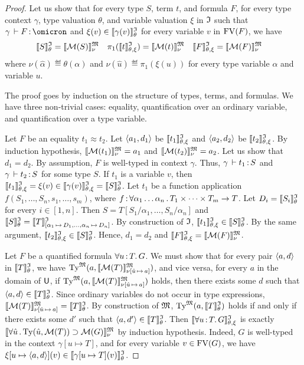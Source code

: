 \begin{proof}
Let us show that for every type $S$, term $t$, and formula $F$,
for every type context $\gamma$, type valuation $\theta$,
and variable valuation $\xi$ in $\mathfrak{I}$ such that
$\gamma\,\vdash F \ty \omicron$ and $\xi(v) \in \llbracket\gamma(v)\rrbracket^{\mathfrak{I}}_{\theta}$
for every variable $v$ in $\mathrm{FV}(F)$, we have
\begin{align*}
\llbracket S\rrbracket^{\mathfrak{I}}_{\theta} &= \llbracket \mathcal{M}(S) \rrbracket^{\mathfrak{M}}_{\nu} &
\pi_1(\llbracket t\rrbracket^{\mathfrak{I}}_{\theta,\xi}) &= \llbracket \mathcal{M}(t) \rrbracket^{\mathfrak{M}}_{\nu} &
\llbracket F\rrbracket^{\mathfrak{I}}_{\theta,\xi} &= \llbracket \mathcal{M}(F) \rrbracket^{\mathfrak{M}}_{\nu}
\end{align*}
where $\nu(\hat{\alpha}) \eqdef \theta(\alpha)$ and
$\nu(\hat{u}) \eqdef \pi_1(\xi(u))$
for every type variable $\alpha$ and variable $u$.

The proof goes by induction on the structure of types, terms, and formulas.
We have three non-trivial cases: equality, quantification over an ordinary
variable, and quantification over a type variable.

Let $F$ be an equality $t_1 \approx t_2$.
Let $\langle a_1, d_1 \rangle$ be $\llbracket t_1\rrbracket^{\mathfrak{I}}_{\theta,\xi}$ and $\langle a_2, d_2 \rangle$ be $\llbracket t_2\rrbracket^{\mathfrak{I}}_{\theta,\xi}$.
By induction hypothesis, $\llbracket \mathcal{M}(t_1) \rrbracket^{\mathfrak{M}}_{\nu} = a_1$ and
$\llbracket \mathcal{M}(t_2) \rrbracket^{\mathfrak{M}}_{\nu} = a_2$. Let us show that $d_1 = d_2$.
By assumption, $F$ is well-typed in context $\gamma$.
Thus, $\gamma\,\vdash t_1 \operatorname{:} S$ and $\gamma\,\vdash t_2 \operatorname{:} S$
for some type $S$.
If $t_1$ is a variable $v$, then
$\llbracket t_1\rrbracket^{\mathfrak{I}}_{\theta,\xi} = \xi(v) \in \llbracket\gamma(v)\rrbracket^{\mathfrak{I}}_{\theta,\xi} = \llbracket S\rrbracket^{\mathfrak{I}}_{\theta}$.
Let $t_1$ be a function application $f(S_1,\dots,S_n,s_1,\dots,s_m)$,
where $f \operatorname{:}
\forall \alpha_1\dots\alpha_n \,.\, T_1 \times \dots \times T_m \to T$.
Let $D_i = \llbracket S_i\rrbracket^{\mathfrak{I}}_{\theta}$ for every $i \in [1,n]$.
Then $S = T[S_1/\alpha_1,\dots,S_n/\alpha_n]$ and
$\llbracket S\rrbracket^{\mathfrak{I}}_{\theta} = \llbracket T \rrbracket^{\mathfrak{I}}_{[\alpha_1 \,\mapsto\, D_1,\dots,
\alpha_n \,\mapsto\, D_n]}$.
By construction of $\mathfrak{I}$, $\llbracket t_1\rrbracket^{\mathfrak{I}}_{\theta,\xi} \in \llbracket S\rrbracket^{\mathfrak{I}}_{\theta}$.
By the same argument, $\llbracket t_2\rrbracket^{\mathfrak{I}}_{\theta,\xi} \in \llbracket S\rrbracket^{\mathfrak{I}}_{\theta}$.
Hence, $d_1 = d_2$ and $\llbracket F\rrbracket^{\mathfrak{I}}_{\theta,\xi} = \llbracket \mathcal{M}(F) \rrbracket^{\mathfrak{M}}_{\nu}$.

Let $F$ be a quantified formula $\forall u \operatorname{:} T .\, G$.
We must show that for every pair $\langle a,d \rangle$ in $\llbracket T\rrbracket^{\mathfrak{I}}_{\theta}$, we have
$\mathrm{Ty}^{\mathfrak{M}}(a, \llbracket \mathcal{M}(T) \rrbracket^{\mathfrak{M}}_{\nu[\hat{u}\,\mapsto\,a]})$,
and vice versa, for every $a$ in the domain of $\mathsf{U}$, if
$\mathrm{Ty}^{\mathfrak{M}}(a, \llbracket \mathcal{M}(T) \rrbracket^{\mathfrak{M}}_{\nu[\hat{u}\,\mapsto\,a]})$
holds, then there exists some $d$ such that $\langle a,d \rangle \in
\llbracket T\rrbracket^{\mathfrak{I}}_{\theta}$.
%
Since ordinary variables do not occur in type expressions,
$\llbracket \mathcal{M}(T) \rrbracket^{\mathfrak{M}}_{\nu[\hat{u}\,\mapsto\,a]} =
\llbracket T \rrbracket^{\mathfrak{I}}_\theta$.
By construction of $\mathfrak{M}$,
$\mathrm{Ty}^{\mathfrak{M}}(a, \llbracket T \rrbracket^{\mathfrak{I}}_\theta)$
holds if and only if there exists some $d'$ such that
$\langle a,d' \rangle \in \llbracket T \rrbracket^{\mathfrak{I}}_\theta$.
%
Then $\llbracket\forall u \operatorname{:} T .\, G\rrbracket^{\mathfrak{I}}_{\theta,\xi}$ is exactly
$\llbracket \forall \hat{u} \,.\, \mathrm{Ty}(\hat{u},\mathcal{M}(T))
\supset \mathcal{M}(G) \rrbracket^{\mathfrak{M}}_{\nu}$ by induction hypothesis.
Indeed, $G$ is well-typed in the context $\gamma[u \mapsto T]$,
and for every variable $v \in \mathrm{FV}(G)$, we have
$\xi[u \mapsto \langle a,d \rangle](v) \in
\llbracket\gamma[u \mapsto T](v)\rrbracket^{\mathfrak{I}}_{\theta}$.


\end{proof}
